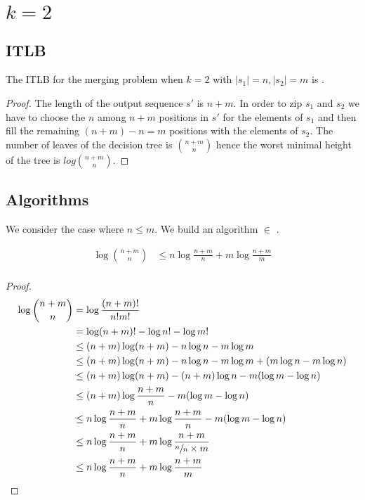 \section{$k=2$}
\label{tree:merging:k=2}

\subsection{ITLB}
\label{tree:merging:k=2:ITLB}


\begin{theorem}
The ITLB for the merging problem when $k = 2$ with $|s_1| = n, |s_2| = m$ is .
\end{theorem}

\begin{proof}
The length of the output sequence $s'$ is $n+m$. In order to zip $s_1$ and $s_2$ we have to choose the $n$ among $n+m$ positions in $s'$ for the elements of $s_1$ and then fill the remaining $(n+m) - n = m$ positions with the elements of $s_2$. The number of leaves of the decision tree is $\binom{n+m}{n}$ hence the worst minimal height of the tree is $log \binom{n+m}{n}$.
\end{proof}


\subsection{Algorithms}
\label{tree:merging:k=2:alg}

We consider the case where $n \leq m$. We build an algorithm $\in$ .

\begin{lemma}
\begin{align*}
\log\binom{n+m}{n} &\leq n \log\frac{n+m}{n} + m \log\frac{n+m}{m}\\
\end{align*}
\end{lemma}

\begin{proof}
\begin{align*}
\log\binom{n+m}{n} &= \log\frac{(n+m)!}{n!m!}\\
&= \log(n+m)! - \log n! - \log m!\\
&\leq (n+m) \log(n+m) - n \log n - m \log m\\
&\leq (n+m) \log(n+m) - n \log n - m \log m + (m \log n - m \log n)\\
&\leq (n+m) \log(n+m) - (n + m) \log n - m (\log m - \log n)\\
&\leq (n+m) \log\frac{n+m}{n} - m (\log m - \log n)\\
&\leq n \log\frac{n+m}{n} + m \log\frac{n+m}{n} - m (\log m - \log n)\\
&\leq n \log\frac{n+m}{n} + m \log\frac{n+m}{\sfrac{n}{n} \times m}\\
&\leq n \log\frac{n+m}{n} + m \log\frac{n+m}{m}\\
\end{align*}
\end{proof}

